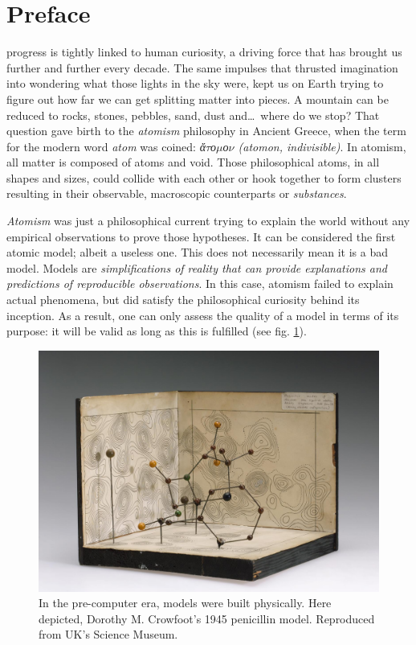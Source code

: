 
\chapter*{Preface}
\label{chap:preface}

 progress is tightly linked to human curiosity, a driving force that has brought us further and further every decade. The same impulses that thrusted imagination into wondering what those lights in the sky were, kept us on Earth trying to figure out how far we can get splitting matter into pieces. A mountain can be reduced to rocks, stones, pebbles, sand, dust and\ldots\  where do we stop? That question gave birth to the \textit{atomism} philosophy in Ancient Greece, when the term for the modern word \textit{atom} was coined: \textit{ἄ$\tau$ο$\mu$ο$\nu$ (atomon, indivisible)}. In atomism, all matter is composed of atoms and void. Those philosophical atoms, in all shapes and sizes, could collide with each other or hook together to form clusters resulting in their observable, macroscopic counterparts or \textit{substances}.

\textit{Atomism} was just a philosophical current trying to explain the world without any empirical observations to prove those hypotheses. It can be considered the first atomic model; albeit a useless one. This does not necessarily mean it is a bad model. Models are \textit{simplifications of reality that can provide explanations and predictions of reproducible observations}. In this case, atomism failed to explain actual phenomena, but did satisfy the philosophical curiosity behind its inception. As a result, one can only assess the quality of a model in terms of its purpose: it will be valid as long as this is fulfilled (see fig. \ref{fig:penicillin}).



\begin{figure}[H]
	\includegraphics[width=\textwidth]{./figures/01/penicillin.jpg}
	\cprotect\caption[Dorothy M. Crowfoot's 1945 Penicillin model]{In the pre-computer era, models were built physically. Here depicted, Dorothy M. Crowfoot's 1945 penicillin model. Reproduced from UK's Science Museum.\cite{uksciencemuseum}}
	\label{fig:penicillin}
\end{figure}



